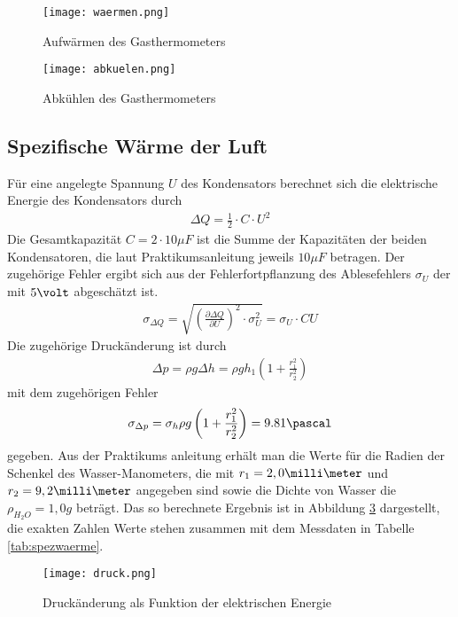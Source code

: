 \documentclass[12pt, a4paper, twoside]{scrartcl}
\begin{document}
\begin{figure} [H]
\centering
\texttt{[image: waermen.png]}
\caption{\label{wplot}Aufwärmen des Gasthermometers}
\end{figure}

\begin{figure} [H]
\centering
\texttt{[image: abkuelen.png]}
\caption{\label{kplot}Abkühlen des Gasthermometers}
\end{figure}




\subsection{Spezifische Wärme der Luft}
Für eine angelegte Spannung $U$ des Kondensators berechnet sich die elektrische Energie des Kondensators durch
\begin{align*}
\Delta Q=\frac{1}{2}\cdot C\cdot U^2
\end{align*}
Die Gesamtkapazität $C=2\cdot10\mu F$ ist die Summe der Kapazitäten der beiden Kondensatoren, die laut Praktikumsanleitung jeweils $10\mu F$ betragen. Der zugehörige Fehler ergibt sich aus der Fehlerfortpflanzung des Ablesefehlers $\sigma_U$ der mit $5\volt$ abgeschätzt ist. 
\begin{align*}
\sigma_{\Delta Q}=\sqrt{\left(\frac{\partial\Delta Q}{\partial U}\right)^2\cdot\sigma_U^2}=\sigma_U\cdot CU
\end{align*}
Die zugehörige Druckänderung ist durch
\begin{align*}
\Delta p=\rho g\Delta h=\rho g h_1\left(1+\frac{r_1^2}{r_2^2}\right)
\end{align*}
mit dem zugehörigen Fehler
\begin{align*}
\sigma_{\Delta p}=\sigma_h\rho g\left(1+\frac{r_1^2}{r_2^2}\right)=9.81\pascal
\end{align*}
gegeben. Aus der Praktikums anleitung erhält man die Werte für die Radien der Schenkel des Wasser-Manometers, die mit $r_1=2,0\milli\meter$ und $r_2=9,2\milli\meter$ angegeben sind sowie die Dichte von Wasser die $\rho_{H_2O}=1,0g$ beträgt. Das so berechnete Ergebnis ist in Abbildung \ref{druckplot} dargestellt, die exakten Zahlen Werte stehen zusammen mit dem Messdaten in Tabelle \ref{tab:spezwaerme}.


\begin{figure}[H]
\centering
\texttt{[image: druck.png]}
\caption{\label{druckplot}Druckänderung als Funktion der elektrischen Energie}
\end{figure}
\end{document}
